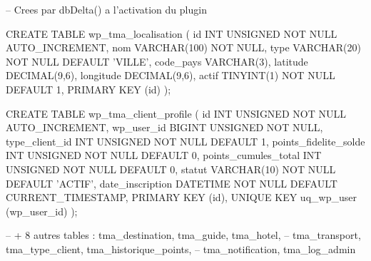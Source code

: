 \documentclass[12pt,a4paper]{report}
\begin{document}
\begin{shellbox}
-- Crees par dbDelta() a l'activation du plugin

CREATE TABLE wp_tma_localisation (
  id INT UNSIGNED NOT NULL AUTO_INCREMENT,
  nom VARCHAR(100) NOT NULL,
  type VARCHAR(20) NOT NULL DEFAULT 'VILLE',
  code_pays VARCHAR(3),
  latitude DECIMAL(9,6), longitude DECIMAL(9,6),
  actif TINYINT(1) NOT NULL DEFAULT 1,
  PRIMARY KEY (id)
);

CREATE TABLE wp_tma_client_profile (
  id INT UNSIGNED NOT NULL AUTO_INCREMENT,
  wp_user_id BIGINT UNSIGNED NOT NULL,
  type_client_id INT UNSIGNED NOT NULL DEFAULT 1,
  points_fidelite_solde INT UNSIGNED NOT NULL DEFAULT 0,
  points_cumules_total INT UNSIGNED NOT NULL DEFAULT 0,
  statut VARCHAR(10) NOT NULL DEFAULT 'ACTIF',
  date_inscription DATETIME NOT NULL DEFAULT CURRENT_TIMESTAMP,
  PRIMARY KEY (id),
  UNIQUE KEY uq_wp_user (wp_user_id)
);

-- + 8 autres tables : tma_destination, tma_guide, tma_hotel,
--   tma_transport, tma_type_client, tma_historique_points,
--   tma_notification, tma_log_admin
\end{shellbox}

\vspace{2cm}
\begin{center}
\end{center}
\end{document}
